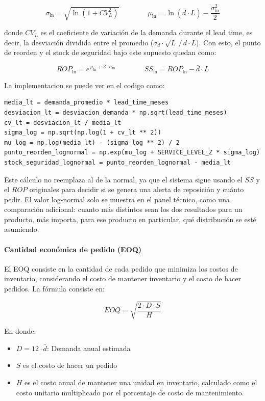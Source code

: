 \[
\sigma_{\ln} = \sqrt{\ln\left(1 + CV_L^2\right)}
\qquad\qquad
\mu_{\ln} = \ln(\bar{d} \cdot L) - \frac{\sigma_{\ln}^2}{2}
\]

donde $CV_L$ es el coeficiente de variación de la demanda durante el lead time, es decir, la desviación dividida entre el promedio ($\sigma_d \cdot \sqrt{L} \,/\, \bar{d} \cdot L$). Con esto, el punto de reorden y el stock de seguridad bajo este supuesto quedan como:

\[
ROP_{\ln} = e^{\,\mu_{\ln} + Z \cdot \sigma_{\ln}}
\qquad\qquad
SS_{\ln} = ROP_{\ln} - \bar{d} \cdot L
\]

La implementacion se puede ver en el codigo como:
\label{lst:reposicion_lognormal}
\begin{verbatim}
media_lt = demanda_promedio * lead_time_meses
desviacion_lt = desviacion_demanda * np.sqrt(lead_time_meses)
cv_lt = desviacion_lt / media_lt
sigma_log = np.sqrt(np.log(1 + cv_lt ** 2))
mu_log = np.log(media_lt) - (sigma_log ** 2) / 2
punto_reorden_lognormal = np.exp(mu_log + SERVICE_LEVEL_Z * sigma_log)
stock_seguridad_lognormal = punto_reorden_lognormal - media_lt
\end{verbatim}

Este cálculo no reemplaza al de la normal, ya que el sistema sigue usando el $SS$ y el $ROP$ originales para decidir si se genera una alerta de reposición y cuánto pedir. El valor log-normal solo se muestra en el panel técnico, como una comparación adicional: cuanto más distintos sean los dos resultados para un producto, más importa, para ese producto en particular, qué distribución se esté asumiendo.

\paragraph{Cantidad económica de pedido (EOQ)}

El EOQ consiste en la cantidad de cada pedido que minimiza los costos de inventario, considerando el costo de mantener inventario y el costo de hacer pedidos. La fórmula consiste en:

\[
EOQ = \sqrt{\frac{2 \cdot D \cdot S}{H}}
\]

En donde:

\begin{itemize}
    \item $D = 12 \cdot \bar{d}$: Demanda anual estimada
    \item $S$ es el costo de hacer un pedido
    \item $H$ es el costo anual de mantener una unidad en inventario, calculado como el costo unitario multiplicado por el porcentaje de costo de mantenimiento.
\end{itemize}

